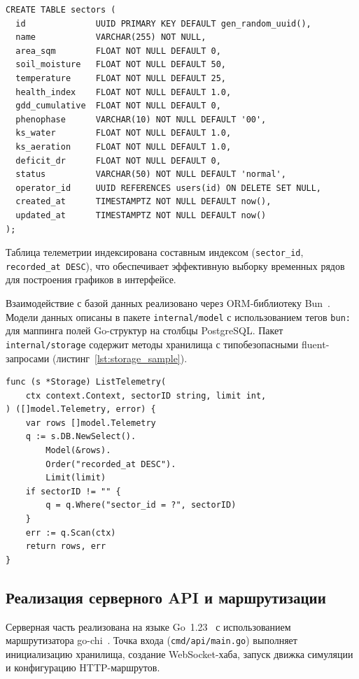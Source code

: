 \begin{lstlisting}[caption={Создание таблицы секторов (фрагмент 001\_init.sql)}, label={lst:sql_sectors}]
CREATE TABLE sectors (
  id              UUID PRIMARY KEY DEFAULT gen_random_uuid(),
  name            VARCHAR(255) NOT NULL,
  area_sqm        FLOAT NOT NULL DEFAULT 0,
  soil_moisture   FLOAT NOT NULL DEFAULT 50,
  temperature     FLOAT NOT NULL DEFAULT 25,
  health_index    FLOAT NOT NULL DEFAULT 1.0,
  gdd_cumulative  FLOAT NOT NULL DEFAULT 0,
  phenophase      VARCHAR(10) NOT NULL DEFAULT '00',
  ks_water        FLOAT NOT NULL DEFAULT 1.0,
  ks_aeration     FLOAT NOT NULL DEFAULT 1.0,
  deficit_dr      FLOAT NOT NULL DEFAULT 0,
  status          VARCHAR(50) NOT NULL DEFAULT 'normal',
  operator_id     UUID REFERENCES users(id) ON DELETE SET NULL,
  created_at      TIMESTAMPTZ NOT NULL DEFAULT now(),
  updated_at      TIMESTAMPTZ NOT NULL DEFAULT now()
);
\end{lstlisting}

Таблица телеметрии индексирована составным индексом
(\texttt{sector\_id}, \texttt{recorded\_at~DESC}), что
обеспечивает эффективную выборку временных рядов для
построения графиков в интерфейсе.

Взаимодействие с базой данных реализовано через ORM-библиотеку
Bun~\cite{bun_uptrace_official,bun_github}. Модели данных
описаны в пакете \texttt{internal/model} с использованием
тегов \texttt{bun:} для маппинга полей Go-структур на столбцы
PostgreSQL. Пакет \texttt{internal/storage} содержит методы
хранилища с типобезопасными fluent-запросами
(листинг~\ref{lst:storage_sample}).

\begin{lstlisting}[caption={Пример метода хранилища (выборка телеметрии)}, label={lst:storage_sample}]
func (s *Storage) ListTelemetry(
    ctx context.Context, sectorID string, limit int,
) ([]model.Telemetry, error) {
    var rows []model.Telemetry
    q := s.DB.NewSelect().
        Model(&rows).
        Order("recorded_at DESC").
        Limit(limit)
    if sectorID != "" {
        q = q.Where("sector_id = ?", sectorID)
    }
    err := q.Scan(ctx)
    return rows, err
}
\end{lstlisting}


\subsection{Реализация серверного API и маршрутизации}

Серверная часть реализована на языке Go~1.23~\cite{go_dev_official,effective_go}
с использованием маршрутизатора go-chi~\cite{go_chi_github,go_chi_pkgdev}.
Точка входа (\texttt{cmd/api/main.go}) выполняет инициализацию
хранилища, создание WebSocket-хаба, запуск движка симуляции
и конфигурацию HTTP-маршрутов.

